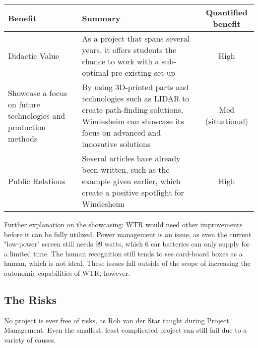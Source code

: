 \begin{tabular}{|L{6cm}|L{6cm}|c|}
\hline
Benefit & Summary & Quantified benefit \\ \hline
Didactic Value & As a project that spans several years, it offers students the chance to work with a sub-optimal pre-existing set-up & High \\ \hline
Showcase a focus on future technologies and production methods & By using 3D-printed parts and technologies such as LIDAR to create path-finding solutions, Windesheim can showcase its focus on advanced and innovative solutions & Med (situational) \\ \hline
Public Relations & Several articles have already been written, such as the example given earlier, which create a positive spotlight for Windesheim & High \\ \hline
\end{tabular}

Further explanation on the showcasing: WTR would need other improvements before it can be fully utilized.
Power management is an issue, as even the current "low-power" screen still needs 99 watts, which 6 car batteries can only supply for a limited time.
The human recognition still tends to see card-board boxes as a human, which is not ideal.
These issues fall outside of the scope of increasing the autonomic capabilities of WTR, however.

\clearpage
\subsection{The Risks}
No project is ever free of risks, as Rob van der Star taught during Project Management.
Even the smallest, least complicated project can still fail due to a variety of causes.

